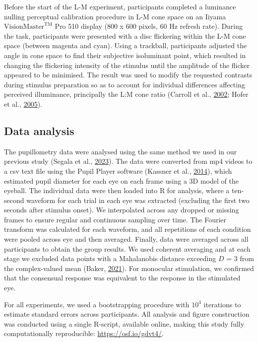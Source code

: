 \documentclass[
]{article}
\begin{document}
Before the start of the L-M experiment, participants completed a luminance nulling perceptual calibration procedure in L-M cone space on an Iiyama \(\textrm{VisionMaster}^{\textrm{TM}}\) Pro 510 display (800 x 600 pixels, 60 Hz refresh rate). During the task, participants were presented with a disc flickering within the L-M cone space (between magenta and cyan). Using a trackball, participants adjusted the angle in cone space to find their subjective isoluminant point, which resulted in changing the flickering intensity of the stimulus until the amplitude of the flicker appeared to be minimised. The result was used to modify the requested contrasts during stimulus preparation so as to account for individual differences affecting perceived illuminance, principally the L:M cone ratio (Carroll et al., \protect\hyperlink{ref-Carroll2002}{2002}; Hofer et al., \protect\hyperlink{ref-Hofer2005}{2005}).

\hypertarget{data-analysis}{%
\subsection{Data analysis}\label{data-analysis}}

The pupillometry data were analysed using the same method we used in our previous study (Segala et al., \protect\hyperlink{ref-Segala2023}{2023}). The data were converted from mp4 videos to a csv text file using the Pupil Player software (Kassner et al., \protect\hyperlink{ref-Kassner2014}{2014}), which estimated pupil diameter for each eye on each frame using a 3D model of the eyeball. The individual data were then loaded into R for analysis, where a ten-second waveform for each trial in each eye was extracted (excluding the first two seconds after stimulus onset). We interpolated across any dropped or missing frames to ensure regular and continuous sampling over time. The Fourier transform was calculated for each waveform, and all repetitions of each condition were pooled across eye and then averaged. Finally, data were averaged across all participants to obtain the group results. We used coherent averaging and at each stage we excluded data points with a Mahalanobis distance exceeding \(D\) = 3 from the complex-valued mean (Baker, \protect\hyperlink{ref-Baker2021}{2021}). For monocular stimulation, we confirmed that the consensual response was equivalent to the response in the stimulated eye.

For all experiments, we used a bootstrapping procedure with \ensuremath{10^{4}} iterations to estimate standard errors across participants. All analysis and figure construction was conducted using a single R-script, available online, making this study fully computationally reproducible: \url{https://osf.io/gdvt4/}.
\end{document}
